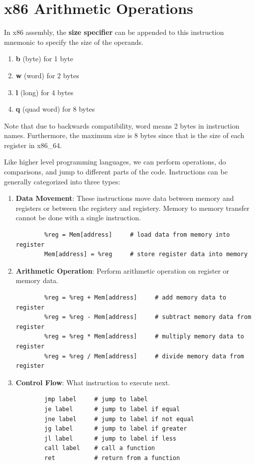 \section{x86 Arithmetic Operations} 

  \begin{definition}
    \label{def:size-specifier}
    In x86 assembly, the \textbf{size specifier} can be appended to this instruction mnemonic to specify the size of the operands. 
    \begin{enumerate} 
      \item \textbf{b} (byte) for 1 byte 
      \item \textbf{w} (word) for 2 bytes
      \item \textbf{l} (long) for 4 bytes 
      \item \textbf{q} (quad word) for 8 bytes
    \end{enumerate}
    Note that due to backwards compatibility, word means 2 bytes in instruction names. Furthermore, the maximum size is 8 bytes since that is the size of each register in x86\_64. 
  \end{definition}

  Like higher level programming languages, we can perform operations, do comparisons, and jump to different parts of the code. Instructions can be generally categorized into three types: 
  \begin{enumerate} 
    \item \textbf{Data Movement}: These instructions move data between memory and registers or between the registery and registery. Memory to memory transfer cannot be done with a single instruction. 
      \begin{lstlisting} 
        %reg = Mem[address]     # load data from memory into register
        Mem[address] = %reg     # store register data into memory
      \end{lstlisting}
    \item \textbf{Arithmetic Operation}: Perform arithmetic operation on register or memory data. 
      \begin{lstlisting} 
        %reg = %reg + Mem[address]     # add memory data to register
        %reg = %reg - Mem[address]     # subtract memory data from register
        %reg = %reg * Mem[address]     # multiply memory data to register
        %reg = %reg / Mem[address]     # divide memory data from register
      \end{lstlisting}
    \item \textbf{Control Flow}: What instruction to execute next. 
      \begin{lstlisting} 
        jmp label     # jump to label
        je label      # jump to label if equal
        jne label     # jump to label if not equal
        jg label      # jump to label if greater
        jl label      # jump to label if less
        call label    # call a function
        ret           # return from a function
      \end{lstlisting}
  \end{enumerate}

